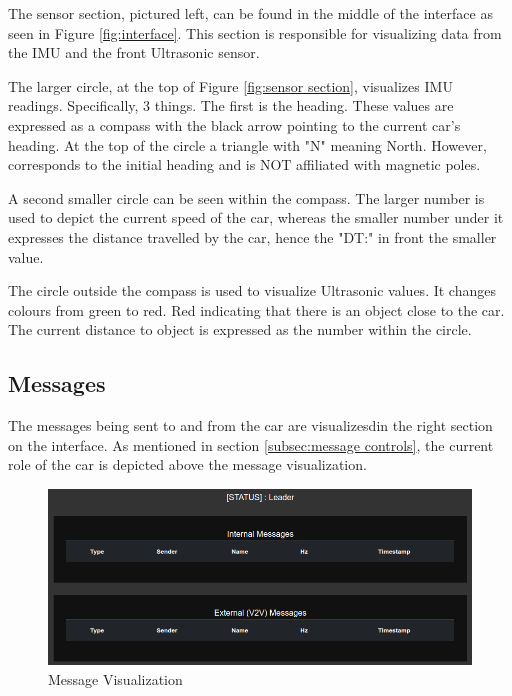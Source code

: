 \documentclass[12pt]{article}
\begin{document}
\hspace{0.02\textwidth} %
\begin{minipage}[t]{0.58\textwidth}
    \vspace{0pt}
    \setlength{\parindent}{20pt}
	The sensor section, pictured left, can be found in the middle of the interface as seen in Figure \ref{fig:interface}. This section is responsible for visualizing data from the IMU and the front Ultrasonic sensor.\par
    The larger circle, at the top of Figure \ref{fig:sensor section}, visualizes IMU readings. Specifically, 3 things. The first is the heading. These values are expressed as a compass with the black arrow pointing to the current car's heading. At the top of the circle a triangle with "N" meaning North. However, corresponds to the initial heading and is NOT affiliated with magnetic poles.\par
    A second smaller circle can be seen within the compass. The larger number is used to depict the current speed of the car, whereas the smaller number under it expresses the distance travelled by the car, hence the "DT:" in front the smaller value. \par
    The circle outside the compass is used to visualize Ultrasonic values. It changes colours from green to red. Red indicating that there is an object close to the car. The current distance to object is expressed as the number within the circle.
\end{minipage}%

\subsection{Messages}
The messages being sent to and from the car are visualizesdin the right section on the interface. As mentioned in section \ref{subsec:message controls}, the current role of the car is depicted above the message visualization. 
\FloatBarrier %
\begin{figure}[ht]
\centering
\includegraphics[width=\linewidth]{Images/message_section.png}
\caption{Message Visualization}
\label{fig:message section}
\end{figure}
\FloatBarrier %
\end{document}

